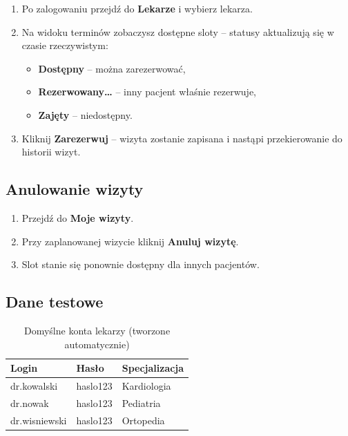 \documentclass[12pt, a4paper]{article}
\begin{document}
\begin{enumerate}
  \item Po zalogowaniu przejdź do \textbf{Lekarze} i wybierz lekarza.
  \item Na widoku terminów zobaczysz dostępne sloty -- statusy aktualizują się w czasie rzeczywistym:
    \begin{itemize}
      \item \textbf{Dostępny} -- można zarezerwować,
      \item \textbf{Rezerwowany\ldots} -- inny pacjent właśnie rezerwuje,
      \item \textbf{Zajęty} -- niedostępny.
    \end{itemize}
  \item Kliknij \textbf{Zarezerwuj} -- wizyta zostanie zapisana i nastąpi przekierowanie do historii wizyt.
\end{enumerate}

\subsection{Anulowanie wizyty}

\begin{enumerate}
  \item Przejdź do \textbf{Moje wizyty}.
  \item Przy zaplanowanej wizycie kliknij \textbf{Anuluj wizytę}.
  \item Slot stanie się ponownie dostępny dla innych pacjentów.
\end{enumerate}

\subsection{Dane testowe}

\begin{table}[H]
\centering
\begin{tabular}{lll}
\toprule
\textbf{Login} & \textbf{Hasło} & \textbf{Specjalizacja} \\
\midrule
dr.kowalski   & haslo123 & Kardiologia \\
dr.nowak      & haslo123 & Pediatria \\
dr.wisniewski & haslo123 & Ortopedia \\
\bottomrule
\end{tabular}
\caption{Domyślne konta lekarzy (tworzone automatycznie)}
\end{table}

\end{document}
